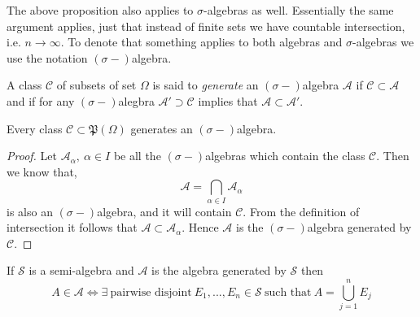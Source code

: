 \begin{remark}
The above proposition also applies to $\sigma$-algebras as well. Essentially the same argument applies, just that instead of finite sets we have countable intersection, i.e. $n\to \infty$. To denote that something applies to both algebras and $\sigma$-algebras we use the notation $(\sigma-)$algebra.
\end{remark}
\begin{definition}
  A class $\mathscr{C}$ of subsets of set $\Omega$ is said to \textit{generate} an $(\sigma-)$algebra $\mathscr{A}$ if $\mathscr{C}\subset \mathscr{A}$ and if for any $(\sigma-)$alegbra $\mathscr{A}'\supset \mathscr{C}$ implies that $\mathscr{A}\subset \mathscr{A}'$.
\end{definition}
\begin{proposition}
  Every class $\mathscr{C}\subset \mathfrak{P} (\Omega)$ generates an $(\sigma-)$algebra.
\end{proposition}
\begin{proof}
  Let $\mathscr{A}_\alpha,\ \alpha\in I$ be all the $(\sigma-)$algebras which contain the class $\mathscr{C}$. Then we know that,
  \[\mathscr{A} = \bigcap_{\alpha\in I} \mathscr{A}_\alpha\]
  is also an $(\sigma-)$algebra, and it will contain $\mathscr{C}$. From the definition of intersection it follows that $\mathscr{A}\subset \mathscr{A}_\alpha$. Hence $\mathscr{A}$ is the $(\sigma-)$algebra generated by $\mathscr{C}$.
\end{proof}
\begin{proposition}
  If $\mathscr{S}$ is a semi-algebra and $\mathscr{A}$ is the algebra generated by $\mathscr{S}$ then
  \[A\in \mathscr{A} \iff \exists\ \text{pairwise disjoint}\ E_1,...,E_n\in\mathscr{S}\ \text{such that}\ A = \bigcup_{j=1}^{n} E_j \]
\end{proposition}
